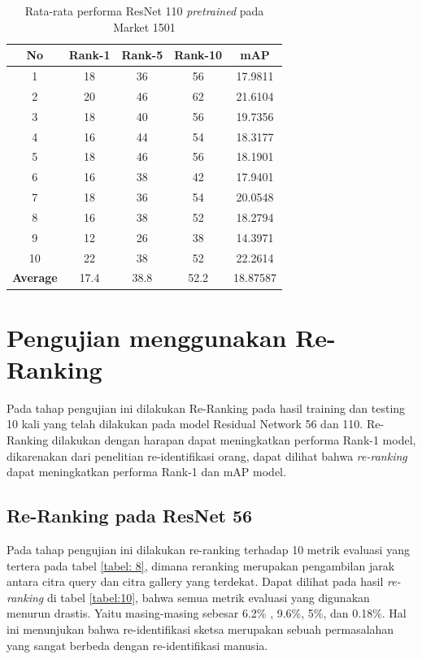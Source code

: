 \begin{longtable}{|c|c|c|c|c|}
	\caption{Rata-rata performa ResNet 110 \textit{pretrained} pada Market 1501 }
	\label{tabel: 9}\\
	\hline
	\rowcolor[HTML]{C0C0C0}
	\textbf{No} &\textbf{Rank-1} & \textbf{Rank-5} & \textbf{Rank-10} & \textbf{mAP} \\
	\hline
	1 & 18 & 36 & 56 & 17.9811\\
	2 & 20 & 46 & 62 & 21.6104\\
	3 & 18 & 40 & 56 & 19.7356\\
	4 & 16 & 44 & 54 & 18.3177\\
	5 & 18 & 46 & 56 & 18.1901\\
	6 & 16 & 38 & 42 & 17.9401\\
	7 & 18 & 36 & 54 & 20.0548\\
	8 & 16 & 38 & 52 & 18.2794\\
	9 & 12 & 26 & 38 & 14.3971\\
	10 & 22 & 38 & 52 & 22.2614\\
	\hline
	\textbf{Average} & 17.4 & 38.8 & 52.2 & 18.87587\\
	\hline
\end{longtable}
\vspace{2ex}
\section{Pengujian menggunakan Re-Ranking}
\vspace{2ex}
Pada tahap pengujian ini dilakukan Re-Ranking pada hasil training dan testing 10 kali yang telah dilakukan pada model Residual Network 56 dan 110. Re-Ranking dilakukan dengan harapan dapat meningkatkan performa Rank-1 model, dikarenakan dari penelitian re-identifikasi orang, dapat dilihat bahwa \textit{re-ranking} dapat meningkatkan performa Rank-1 dan mAP model.
\vspace{2ex}
\subsection{Re-Ranking pada ResNet 56}
\vspace{2ex}
Pada tahap pengujian ini dilakukan re-ranking terhadap 10 metrik evaluasi yang tertera pada tabel \ref{tabel: 8}, dimana reranking merupakan pengambilan jarak antara citra query dan citra gallery yang terdekat. Dapat dilihat pada hasil \textit{re-ranking} di tabel \ref{tabel:10}, bahwa semua metrik evaluasi yang digunakan menurun drastis. Yaitu masing-masing sebesar 6.2\% , 9.6\%, 5\%, dan 0.18\%. Hal ini menunjukan bahwa re-identifikasi sketsa merupakan sebuah permasalahan yang sangat berbeda dengan re-identifikasi manusia.


